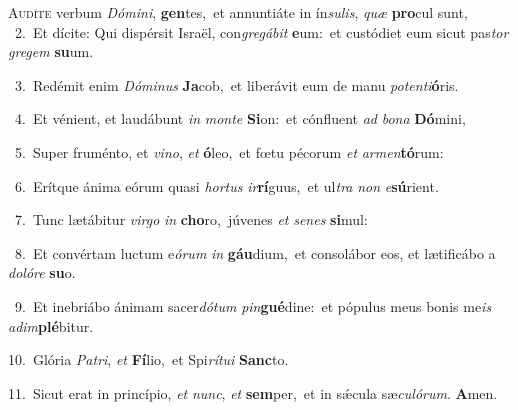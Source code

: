 \lettrine{\initial\textcolor{\initialcolor}{A}}{udíte} verbum \textit{Dó}\-\textit{mi}\textit{ni}, \textbf{gen}\-tes,~\star et annuntiáte in ín\-\textit{su}\-\textit{lis}, \textit{quæ} \textbf{pro}\-cul sunt,\\
{\numbfont\textcolor{\numbcolor}{~2.}}~Et dícite: Qui dispérsit Israël, con\-\textit{gre}\-\textit{gá}\textit{bit} \textbf{e}\-um:~\star et custódiet eum sicut pas\textit{tor} \textit{gre}\-\textit{gem} \textbf{su}\-um.\par
{\numbfont\textcolor{\numbcolor}{~3.}}~Redémit enim \textit{Dó}\-\textit{mi}\textit{nus} \textbf{Ja}\-cob,~\star et liberávit eum de manu \textit{pot}\-\textit{en}\textit{ti}\textbf{ó}ris.\par
{\numbfont\textcolor{\numbcolor}{~4.}}~Et vénient, et laudábunt \textit{in} \textit{mon}\-\textit{te} \textbf{Si}\-on:~\star et cónfluent \textit{ad} \textit{bo}\-\textit{na} \textbf{Dó}\-mini,\par
{\numbfont\textcolor{\numbcolor}{~5.}}~Super fruménto, et \textit{vi}\-\textit{no}, \textit{et} \textbf{ó}\-leo,~\star et fœtu pécorum \textit{et} \textit{ar}\-\textit{men}\textbf{tó}rum:\par
{\numbfont\textcolor{\numbcolor}{~6.}}~Erítque ánima eórum quasi \textit{hor}\-\textit{tus} \textit{ir}\-\textbf{rí}guus,~\star et ul\textit{tra} \textit{non} \textit{e}\-\textbf{sú}rient.\par
{\numbfont\textcolor{\numbcolor}{~7.}}~Tunc lætábitur \textit{vir}\-\textit{go} \textit{in} \textbf{cho}\-ro,~\star júvenes \textit{et} \textit{se}\-\textit{nes} \textbf{si}\-mul:\par
{\numbfont\textcolor{\numbcolor}{~8.}}~Et convértam luctum e\-\textit{ó}\-\textit{rum} \textit{in} \textbf{gáu}\-dium,~\star et consolábor eos, et lætificábo a \textit{do}\-\textit{ló}\textit{re} \textbf{su}\-o.\par
{\numbfont\textcolor{\numbcolor}{~9.}}~Et inebriábo ánimam sacer\-\textit{dó}\-\textit{tum} \textit{pin}\-\textbf{gué}dine:~\star et pópulus meus bonis me\textit{is} \textit{ad}\-\textit{im}\textbf{plé}bitur.\par
{\numbfont\textcolor{\numbcolor}{10.}}~Glória \textit{Pa}\-\textit{tri}, \textit{et} \textbf{Fí}\-lio,~\star et Spi\-\textit{rí}\-\textit{tu}\textit{i} \textbf{Sanc}\-to.\par
{\numbfont\textcolor{\numbcolor}{11.}}~Sicut erat in princípio, \textit{et} \textit{nunc}\-, \textit{et} \textbf{sem}\-per,~\star et in sǽcula sæ\-\textit{cu}\-\textit{ló}\textit{rum}. \textbf{A}\-men.\par
